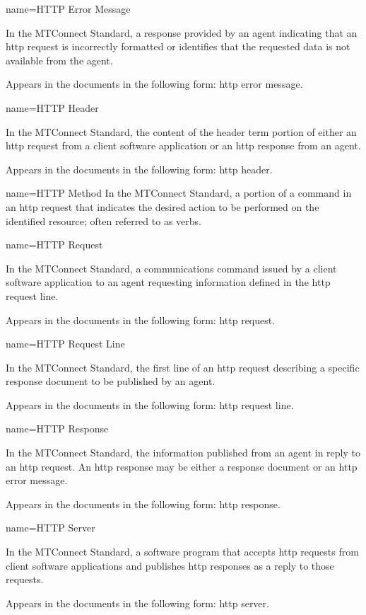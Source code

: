 {
  name={HTTP Error Message}
}
{
	In the MTConnect Standard, a response provided by an \gls{agent} indicating that an \gls{http request} is incorrectly formatted or identifies that the requested data is not available from the \gls{agent}.  

	Appears in the documents in the following form: \gls{http error message}.
}


{
  name={HTTP Header}
}
{
	In the MTConnect Standard, the content of the \gls{header term} portion of either an \gls{http request} from a client software application or an \gls{http response} from an \gls{agent}.

	Appears in the documents in the following form: \gls{http header}.
}


{
  name={HTTP Method}
}
{
	In the MTConnect Standard, a portion of a command in an \gls{http request} that indicates the desired action to be performed on the identified resource; often referred to as verbs.
}


{
  name={HTTP Request}
}
{
	In the MTConnect Standard, a communications command issued by a client software application to an \gls{agent} requesting information defined in the \gls{http request line}.

	Appears in the documents in the following form: \gls{http request}.
}


{
  name={HTTP Request Line}
}
{
	In the MTConnect Standard, the first line of an \gls{http request} describing a specific \gls{response document} to be published by an \gls{agent}.

	Appears in the documents in the following form: \gls{http request line}.
}


{
  name={HTTP Response}
}
{
	In the MTConnect Standard, the information published from an \gls{agent} in reply to an \gls{http request}.  An \gls{http response} may be either a \gls{response document} or an \gls{http error message}.

	Appears in the documents in the following form: \gls{http response}.
}


{
  name={HTTP Server}
}
{
	In the MTConnect Standard, a software program that accepts \glspl{http request} from client software applications and publishes \glspl{http response} as a reply to those \glspl{request}.

	Appears in the documents in the following form: \gls{http server}.
}


